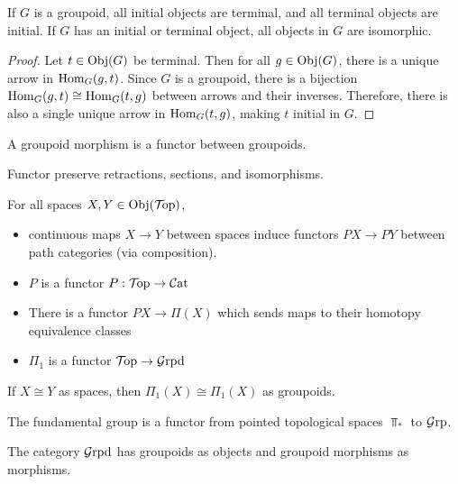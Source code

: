 \documentclass[a5paper]{article}
\begin{document}
\begin{theorem*}
	If $G$ is a groupoid, all initial objects are terminal, and all terminal
  objects are initial. If $G$ has an initial or terminal object, all
  objects in $G$ are isomorphic.
\end{theorem*}
\begin{proof}
  Let $t\in\operatorname{Obj}(G)$ be terminal. Then for all $g\in\operatorname{Obj}(G)$, there is a unique arrow in $\operatorname{Hom}_G(g,t)$. Since $G$ is a groupoid, there is a bijection
  $\operatorname{Hom}_G(g,t)\cong\operatorname{Hom}_G(t,g)$ between arrows and their inverses. Therefore,
  there is also a single unique arrow in $\operatorname{Hom}_G(t,g)$, making $t$ initial in $G$.
\end{proof}


\begin{definition*}
	A groupoid morphism is a functor between groupoids.
\end{definition*}


\begin{proposition*}
  Functor preserve retractions, sections, and isomorphisms.
\end{proposition*}


\begin{proposition*}
  For all spaces $X,Y\in\operatorname{Obj}(\mathcal{T}\!\mathrm{op})$,
  \begin{itemize}
    \item continuous maps $X\to Y$ between spaces induce functors $PX\to PY$
      between path categories (via composition).
    \item $P$ is a functor $P:\mathcal{T}\!\mathrm{op}\to\mathcal{C}\mathrm{at}$
    \item There is a functor $PX\to \Pi(X)$ which sends maps to their homotopy
      equivalence classes
    \item $\Pi_1$ is a functor $\mathcal{T}\!\mathrm{op}\to\mathcal{G}\mathrm{rpd}$
  \end{itemize}
\end{proposition*}


\begin{corollary*}
  If $X\cong Y$ as spaces, then $\Pi_1(X)\cong\Pi_1(X)$ as groupoids.
\end{corollary*}


\begin{proposition*}
  The fundamental group is a functor from pointed topological spaces $\Top_*$ to
  $\mathcal{G}\mathrm{rp}$.
\end{proposition*}


\begin{definition*}[$\Grpd$]
  The category $\Grpd$ has groupoids as objects and groupoid morphisms as
  morphisms. 
\end{definition*}
\end{document}
